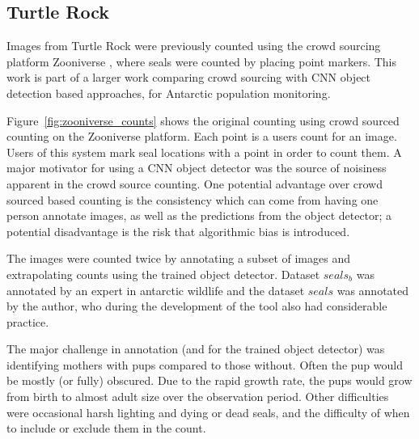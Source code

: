 \subsection{Turtle Rock \cite{Eisert2015}}
 
 Images from Turtle Rock were previously counted using the crowd sourcing platform Zooniverse \cite{Zooniverse}, where seals were counted by placing point markers. This work is part of a larger work comparing crowd sourcing with \gls{CNN} object detection based approaches, for Antarctic population monitoring. 
 
 Figure~\ref{fig:zooniverse_counts} shows the original counting using crowd sourced counting on the Zooniverse \cite{Zooniverse} platform. Each point is a users count for an image. Users of this system mark seal locations with a point in order to count them. A major motivator for using a \gls{CNN} object detector was the source of noisiness apparent in the crowd source counting. One potential advantage over crowd sourced based counting is the consistency which can come from having one person annotate images, as well as the predictions from the object detector; a potential disadvantage is the risk that algorithmic bias is introduced.
 
 The images were counted twice by annotating a subset of images and extrapolating counts using the trained object detector. Dataset $seals_b$ was annotated by an expert in antarctic wildlife and the dataset $seals$ was annotated by the author, who during the development of the tool also had considerable practice. 
 
 The major challenge in annotation (and for the trained object detector) was identifying mothers with pups compared to those without. Often the pup would be mostly (or fully) obscured.  Due to the rapid growth rate, the pups would grow from birth to almost adult size over the observation period. Other difficulties were occasional harsh lighting and dying or dead seals, and the difficulty of when to include or exclude them in the count.

